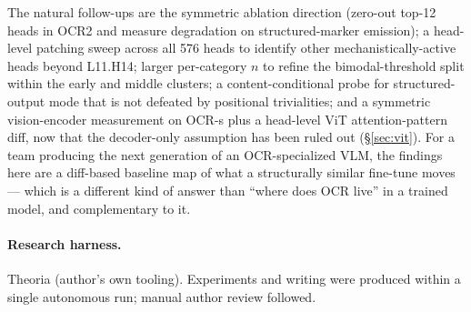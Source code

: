 \documentclass[10pt,twocolumn,letterpaper]{article}
\begin{document}
The natural follow-ups are the symmetric ablation direction (zero-out top-12 heads in OCR2 and measure degradation on structured-marker emission); a head-level patching sweep across all 576 heads to identify other mechanistically-active heads beyond L11.H14; larger per-category $n$ to refine the bimodal-threshold split within the early and middle clusters; a content-conditional probe for structured-output mode that is not defeated by positional trivialities; and a symmetric vision-encoder measurement on OCR-s plus a head-level ViT attention-pattern diff, now that the decoder-only assumption has been ruled out (\S\ref{sec:vit}). For a team producing the next generation of an OCR-specialized VLM, the findings here are a diff-based baseline map of what a structurally similar fine-tune moves --- which is a different kind of answer than ``where does OCR live'' in a trained model, and complementary to it.

\paragraph{Research harness.} Theoria (author's own tooling). Experiments and writing were produced within a single autonomous run; manual author review followed.



\end{document}
